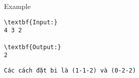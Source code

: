 Example
\begin{verbatim}
\textbf{Input:}
4 3 2

\textbf{Output:}
2\end{verbatim}
\begin{verbatim}
Các cách đặt bi là (1-1-2) và (0-2-2)\end{verbatim}